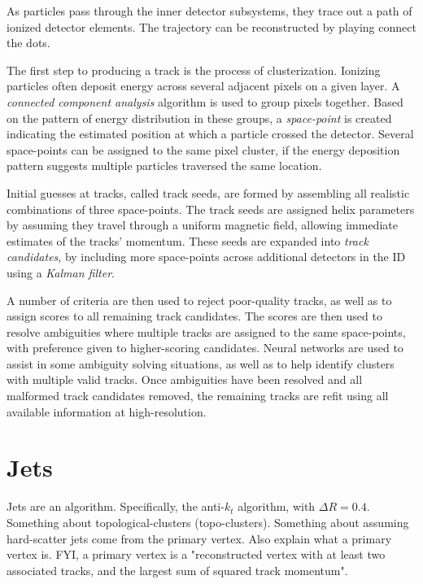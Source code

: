            As particles pass through the inner detector subsystems, they trace out a path of ionized detector elements.
            The trajectory can be reconstructed by playing connect the dots.

            The first step to producing a track is the process of clusterization.
            Ionizing particles often deposit energy across several adjacent pixels on a given layer.
            A \textit{connected component analysis} algorithm is used to group pixels together. 
            Based on the pattern of energy distribution in these groups,
                a \textit{space-point} is created indicating the estimated position at which a particle crossed the detector.
            Several space-points can be assigned to the same pixel cluster,
                if the energy deposition pattern suggests multiple particles traversed the same location.

            Initial guesses at tracks, called track seeds, are formed by assembling all realistic combinations of three space-points.
            The track seeds are assigned helix parameters by assuming they travel through a uniform magnetic field,
                allowing immediate estimates of the tracks' momentum.
            These seeds are expanded into \textit{track candidates},
                by including more space-points across additional detectors in the ID using a \textit{Kalman filter}.

            A number of criteria are then used to reject poor-quality tracks, as well as to assign scores to all remaining track candidates.
            The scores are then used to resolve ambiguities where multiple tracks are assigned to the same space-points,
                with preference given to higher-scoring candidates.
            Neural networks are used to assist in some ambiguity solving situations,
                as well as to help identify clusters with multiple valid tracks.
            Once ambiguities have been resolved and all malformed track candidates removed,
                the remaining tracks are refit using all available information at high-resolution.
            \cite{atlas_track_reco_performance}

    \section{Jets}
        Jets are an algorithm.
        Specifically, the anti-$k_t$ algorithm, with $\Delta R = 0.4$.
        Something about topological-clusters (topo-clusters).
        \cite{anti_kt}
        Something about assuming hard-scatter jets come from the primary vertex.
        Also explain what a primary vertex is.
        FYI, a primary vertex is a "reconstructed vertex with at least two associated tracks, and the largest sum of squared track momentum".

